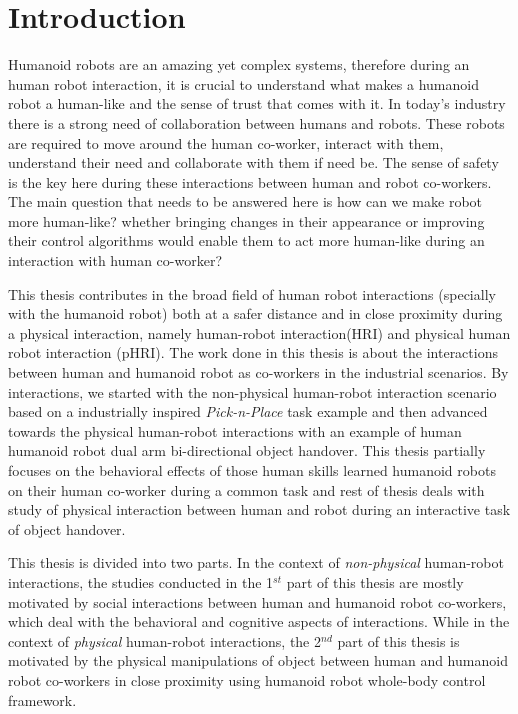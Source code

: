 
{\color{blue}\chapter*{Introduction}}
\pagestyle{plain}

Humanoid robots are an amazing yet complex systems, therefore during an human robot interaction, it is crucial to understand what makes a humanoid robot a human-like and the sense of trust that comes with it. In today's industry there is a strong need of collaboration between humans and robots. These robots are required to move around the human co-worker, interact with them, understand their need and collaborate with them if need be. The sense of safety is the key here during these interactions between human and robot co-workers. The main question that needs to be answered here is how can we make robot more human-like? whether bringing changes in their appearance or improving their control algorithms would enable them to act more human-like during an interaction with human co-worker?

This thesis contributes in the broad field of human robot interactions (specially with the humanoid robot) both at a safer distance and in close proximity during a physical interaction, namely human-robot interaction(HRI) and physical human robot interaction (pHRI). The work done in this thesis is about the interactions between human and humanoid robot as co-workers in the industrial scenarios. By interactions, we started with the non-physical human-robot interaction scenario based on a industrially inspired \textit{Pick-n-Place} task example and then advanced towards the physical human-robot interactions with an example of human humanoid robot dual arm bi-directional object handover. This thesis partially focuses on the behavioral effects of those human skills learned humanoid robots on their human co-worker during a common task and rest of thesis deals with study of physical interaction between human and robot during an interactive task of object handover.

This thesis is divided into two parts. In the context of \textit{non-physical} human-robot interactions, the studies conducted in the 1$^{st}$ part of this thesis are mostly motivated by social interactions between human and humanoid robot co-workers, which deal with the behavioral and cognitive aspects of interactions. While in the context of \textit{physical} human-robot interactions, the 2$^{nd}$ part of this thesis is motivated by the physical manipulations of object between human and humanoid robot co-workers in close proximity using humanoid robot whole-body control framework.


